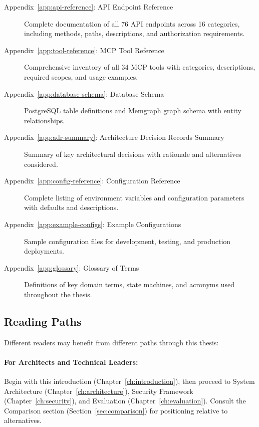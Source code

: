 \begin{description}
    \item[Appendix~\ref{app:api-reference}: API Endpoint Reference] Complete documentation of all 76 API endpoints across 16 categories, including methods, paths, descriptions, and authorization requirements.
    
    \item[Appendix~\ref{app:tool-reference}: MCP Tool Reference] Comprehensive inventory of all 34 MCP tools with categories, descriptions, required scopes, and usage examples.
    
    \item[Appendix~\ref{app:database-schema}: Database Schema] PostgreSQL table definitions and Memgraph graph schema with entity relationships.
    
    \item[Appendix~\ref{app:adr-summary}: Architecture Decision Records Summary] Summary of key architectural decisions with rationale and alternatives considered.
    
    \item[Appendix~\ref{app:config-reference}: Configuration Reference] Complete listing of environment variables and configuration parameters with defaults and descriptions.
    
    \item[Appendix~\ref{app:example-configs}: Example Configurations] Sample configuration files for development, testing, and production deployments.
    
    \item[Appendix~\ref{app:glossary}: Glossary of Terms] Definitions of key domain terms, state machines, and acronyms used throughout the thesis.
\end{description}

\subsection{Reading Paths}

Different readers may benefit from different paths through this thesis:

\paragraph{For Architects and Technical Leaders:}
Begin with this introduction (Chapter~\ref{ch:introduction}), then proceed to System Architecture (Chapter~\ref{ch:architecture}), Security Framework (Chapter~\ref{ch:security}), and Evaluation (Chapter~\ref{ch:evaluation}). Consult the Comparison section (Section~\ref{sec:comparison}) for positioning relative to alternatives.

